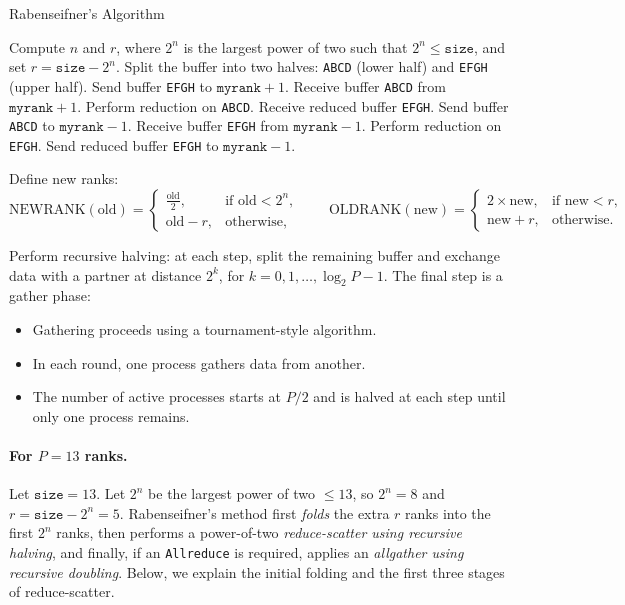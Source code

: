 \documentclass[12pt]{book}
\begin{document}
\begin{algorithm}[H]
\caption{Rabenseifner's Algorithm}
\label{alg:rabenseifner}
\begin{algorithmic}[1]
\State Compute $n$ and $r$, where $2^n$ is the largest power of two such that $2^n \leq \texttt{size}$, and set $r = \texttt{size} - 2^n$.
    \State Split the buffer into two halves: \texttt{ABCD} (lower half) and \texttt{EFGH} (upper half).
        \State Send buffer \texttt{EFGH} to $\texttt{myrank}+1$.
        \State Receive buffer \texttt{ABCD} from $\texttt{myrank}+1$.
        \State Perform reduction on \texttt{ABCD}.
        \State Receive reduced buffer \texttt{EFGH}.
    \Else {}
        \State Send buffer \texttt{ABCD} to $\texttt{myrank}-1$.
        \State Receive buffer \texttt{EFGH} from $\texttt{myrank}-1$.
        \State Perform reduction on \texttt{EFGH}.
        \State Send reduced buffer \texttt{EFGH} to $\texttt{myrank}-1$.
    \EndIf
\EndIf

\State Define new ranks:
\[
\text{NEWRANK}(\text{old}) =
\begin{cases}
\frac{\text{old}}{2}, & \text{if } \text{old}<2^n,\\
\text{old}-r, & \text{otherwise},
\end{cases}
\qquad
\text{OLDRANK}(\text{new}) =
\begin{cases}
2\times \text{new}, & \text{if } \text{new}<r,\\
\text{new}+r, & \text{otherwise}.
\end{cases}
\]

\State Perform recursive halving: at each step, split the remaining buffer and exchange data with a partner at distance $2^k$, for $k=0,1,\ldots,\log_2 P -1$.
\State The final step is a gather phase:
\begin{itemize}
    \item Gathering proceeds using a tournament-style algorithm.
    \item In each round, one process gathers data from another.
    \item The number of active processes starts at $P/2$ and is halved at each step until only one process remains.
\end{itemize}
\end{algorithmic}
\end{algorithm}

\paragraph{For $P=13$ ranks.}
Let \(\texttt{size}=13\). Let \(2^n\) be the largest power of two \(\le 13\), so \(2^n=8\) and \(r=\texttt{size}-2^n=5\).
Rabenseifner's method first \emph{folds} the extra \(r\) ranks into the first \(2^n\) ranks, then performs a power-of-two
\emph{reduce-scatter using recursive halving}, and finally, if an \texttt{Allreduce} is required, applies an \emph{allgather using recursive doubling}.
Below, we explain the initial folding and the first three stages of reduce-scatter.
\end{document}
